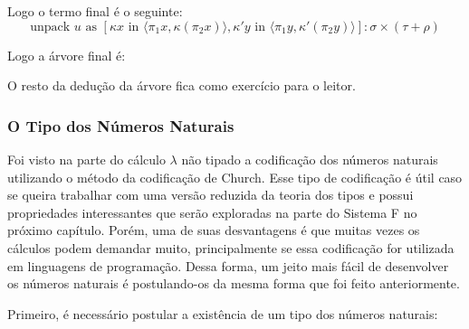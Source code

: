 \documentclass[../main.tex]{subfiles}
\begin{document}
Logo o termo final é o seguinte:
$$ \text{unpack } u \text{ as } [\kappa x \text{ in } \langle \pi_1 x, \kappa( \pi_2 x) \rangle, \kappa'y \text{ in } \langle \pi_1 y, \kappa'( \pi_2 y) \rangle] : \sigma \times (\tau + \rho)$$

Logo a árvore final é:


\begin{prooftree}
\end{prooftree}

O resto da dedução da árvore fica como exercício para o leitor.

\subsubsection{O Tipo dos Números Naturais}

Foi visto na parte do cálculo $\lambda$ não tipado a codificação dos números naturais utilizando o método da codificação de Church. Esse tipo de codificação é útil caso se queira trabalhar com uma versão reduzida da teoria dos tipos e possui propriedades interessantes que serão exploradas na parte do Sistema F no próximo capítulo. Porém, uma de suas desvantagens é que muitas vezes os cálculos podem demandar muito, principalmente se essa codificação for utilizada em linguagens de programação. Dessa forma, um jeito mais fácil de desenvolver os números naturais é postulando-os da mesma forma que foi feito anteriormente.

Primeiro, é necessário postular a existência de um tipo dos números naturais:
\end{document}
